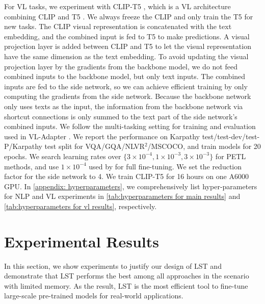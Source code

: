  For VL tasks, we experiment with CLIP-T5 \cite{Sung2021VLAdapterPT}, which is a VL architecture combining CLIP \cite{radford2021learningTV} and T5 \cite{raffel2020exploring}. We always freeze the CLIP and only train the T5 for new tasks. The CLIP visual representation is concatenated with the text embedding, and the combined input is fed to T5 to make predictions. A visual projection layer is added between CLIP and T5 to let the visual representation have the same dimension as the text embedding. To avoid updating the visual projection layer by the gradients from the backbone model, we do not feed combined inputs to the backbone model, but only text inputs. The combined inputs are fed to the side network, so we can achieve efficient training by only computing the gradients from the side network. Because the backbone network only uses texts as the input, the information from the backbone network via shortcut connections is only summed to the text part of the side network's combined inputs. We follow the multi-tasking setting for training and evaluation used in VL-Adapter \cite{Sung2021VLAdapterPT}. We report the performance on Karpathy test/test-dev/test-P/Karpathy test split for VQA/GQA/NLVR$^2$/MSCOCO, and train models for 20 epochs. We search learning rates over $\{3 \times 10^{-4}, 1 \times 10^{-3}, 3 \times 10^{-3} \}$ for PETL methods, and use $1 \times 10^{-4}$ used by \citet{Sung2021VLAdapterPT} for full fine-tuning. We set the reduction factor for the side network to 4. We train CLIP-T5 for 16 hours on one A6000 GPU. In \ref{appendix: hyperparameters}, we comprehensively list hyper-parameters for NLP and VL experiments in \ref{tab:hyperparameters for main results} and \ref{tab:hyperparameters for vl results}, respectively.

\section{Experimental Results} \label{sec: results}

In this section, we show experiments to justify our design of LST and demonstrate that LST performs the best among all approaches in the scenario with limited memory. As the result, LST is the most efficient tool to fine-tune large-scale pre-trained models for real-world applications.


